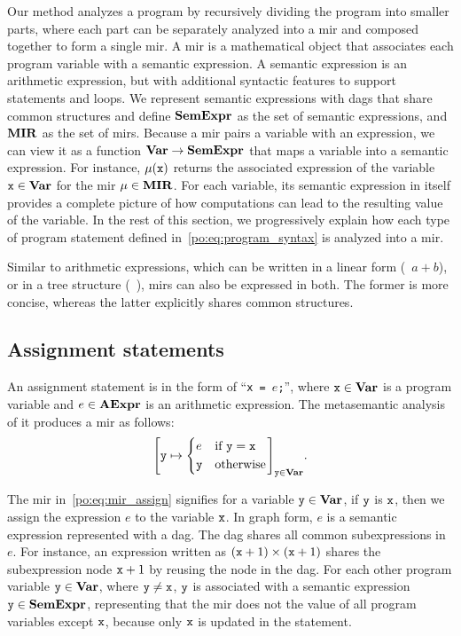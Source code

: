 Our method analyzes a program by recursively dividing the program into smaller
parts, where each part can be separately analyzed into a \gls{mir} and
composed together to form a single \gls{mir}\@.  A \gls{mir} is a mathematical
object that associates each program variable with a semantic expression.  A
semantic expression is an arithmetic expression, but with additional syntactic
features to support \iflit{} statements and \whilelit{} loops.  We represent
semantic expressions with \glspl{dag} that share common structures and define
$\mathbf{SemExpr}$ as the set of semantic expressions, and $\mathbf{MIR}$ as the set of
\glspl{mir}.  Because a \gls{mir} pairs a variable with an expression, we
can view it as a function $\mathbf{Var} \to \mathbf{SemExpr}$ that maps a variable into
a semantic expression.  For instance, $\mu(\texttt{x})$ returns the associated
expression of the variable $\texttt{x} \in \mathbf{Var}$ for the \gls{mir} $\mu \in
\mathbf{MIR}$.  For each variable, its semantic expression in itself provides a
complete picture of how computations can lead to the resulting value of the
variable.  In the rest of this section, we progressively explain how each type
of program statement defined in~\eqref{po:eq:program_syntax} is analyzed into a
\gls{mir}\@.

Similar to arithmetic expressions, which can be written in a linear form
(\eg~$a + b$), or in a tree structure (\eg~),
\glspl{mir} can also be expressed in both.  The former is more concise, whereas
the latter explicitly shares common structures.

\subsection{Assignment statements}

An assignment statement is in the form of ``\texttt{x = $e$;}'', where
$\texttt{x} \in \mathbf{Var}$ is a program variable and $e \in \mathbf{AExpr}$ is an
arithmetic expression.  The metasemantic analysis of it produces a \gls{mir}
as follows:
\begin{equation}
    {\left[
        \texttt{y}\mapsto \left\{
            \begin{aligned}
                & e && \text{if~} \texttt{y}= \texttt{x}\\
                & \texttt{y}&& \text{otherwise}
            \end{aligned}
        \right.
    \right]}_{\texttt{y} \in \mathbf{Var}}.
    \label{po:eq:mir_assign}
\end{equation}

The \gls{mir} in~\eqref{po:eq:mir_assign} signifies for a variable $\texttt{y} \in
\mathbf{Var}$, if $\texttt{y}$ is $\texttt{x}$, then we assign the expression $e$ to the
variable $\texttt{x}$.  In graph form, $e$ is a semantic expression represented with
a \gls{dag}\@.  The \gls{dag} shares all common subexpressions in $e$.  For
instance, an expression written as $(\texttt{x} + 1) \times (\texttt{x} + 1)$ shares the
subexpression node $\texttt{x} + 1$ by reusing the node in the \gls{dag}\@.  For
each other program variable $\texttt{y} \in \mathbf{Var}$, where $\texttt{y} \neq \texttt{x}$,
$\texttt{y}$ is associated with a semantic expression $\texttt{y} \in \mathbf{SemExpr}$,
representing that the \gls{mir} does not the value of all program variables
except $\texttt{x}$, because only $\texttt{x}$ is updated in the statement.

